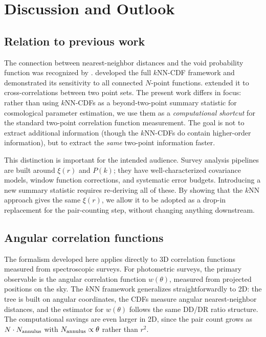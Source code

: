 \section{Discussion and Outlook}
\label{sec:discussion}

\subsection{Relation to previous work}
\label{sec:previous}

The connection between nearest-neighbor distances and the void probability function was recognized by \citet{Kerscher1999}.  \citet{Banerjee2020} developed the full $k$NN-CDF framework and demonstrated its sensitivity to all connected $N$-point functions.  \citet{Banerjee2021} extended it to cross-correlations between two point sets.  The present work differs in focus: rather than using $k$NN-CDFs as a beyond-two-point summary statistic for cosmological parameter estimation, we use them as a \emph{computational shortcut} for the standard two-point correlation function measurement.  The goal is not to extract additional information (though the $k$NN-CDFs do contain higher-order information), but to extract the \emph{same} two-point information faster.

This distinction is important for the intended audience.  Survey analysis pipelines are built around $\xi(r)$ and $P(k)$; they have well-characterized covariance models, window function corrections, and systematic error budgets.  Introducing a new summary statistic requires re-deriving all of these.  By showing that the $k$NN approach gives the same $\xi(r)$, we allow it to be adopted as a drop-in replacement for the pair-counting step, without changing anything downstream.

\subsection{Angular correlation functions}
\label{sec:angular}

The formalism developed here applies directly to 3D correlation functions measured from spectroscopic surveys.  For photometric surveys, the primary observable is the angular correlation function $w(\theta)$, measured from projected positions on the sky.  The $k$NN framework generalizes straightforwardly to 2D: the tree is built on angular coordinates, the CDFs measure angular nearest-neighbor distances, and the estimator for $w(\theta)$ follows the same DD/DR ratio structure.  The computational savings are even larger in 2D, since the pair count grows as $N \cdot N_{\rm annulus}$ with $N_{\rm annulus} \propto \theta$ rather than $r^2$.

